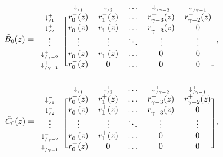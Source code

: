 \documentclass{article}
\begin{document}
\begin{equation*}
\tilde{B}_0(z) = 
\begin{blockarray}{cccccc}
   & \scriptstyle{\downarrow_{/1}^-} & \scriptstyle{\downarrow_{/2}^-} &
   \ldots & \scriptstyle{\downarrow_{/\gamma-2}^-} &
   \scriptstyle{\downarrow_{/\gamma-1}^-} \\
\begin{block}{c[ccccc]}
\scriptstyle{\downarrow_{/1}^+} & r_0^-(z) & r_1^-(z) & \ldots &
    r_{\gamma-3}^-(z) & r_{\gamma-2}^-(z) \\
\scriptstyle{\downarrow_{/2}^+} & r_0^-(z) & r_1^-(z) & \ldots &
    r_{\gamma-3}^-(z) & 0 \\
\vdots & \vdots & \vdots & \ddots & \vdots & \vdots \\
\scriptstyle{\downarrow_{/\gamma-2}^+} & r_0^-(z) & r_1^-(z) &
    \ldots & 0 & 0 \\
\scriptstyle{\downarrow_{/\gamma-1}^+} & r_0^-(z) & 0 & \ldots & 0 & 0 \\
\end{block}
\end{blockarray},
\end{equation*}
\begin{equation*}
\tilde{C}_0(z) = 
\begin{blockarray}{cccccc}
   & \scriptstyle{\downarrow_{/1}^+} & \scriptstyle{\downarrow_{/2}^+} &
    \ldots & \scriptstyle{\downarrow_{/\gamma-2}^+} &
    \scriptstyle{\downarrow_{/\gamma-1}^+} \\
\begin{block}{c[ccccc]}
\scriptstyle{\downarrow_{/1}^-} & r_0^+(z) & r_1^+(z) & \ldots &
    r_{\gamma-3}^+(z) & r_{\gamma-2}^+(z) \\
\scriptstyle{\downarrow_{/2}^-} & r_0^+(z) & r_1^+(z) & \ldots &
    r_{\gamma-3}^+(z) & 0 \\
\vdots & \vdots & \vdots & \ddots & \vdots & \vdots \\
\scriptstyle{\downarrow_{/\gamma-2}^-} & r_0^+(z) & r_1^+(z) & \ldots &
    0 & 0 \\
\scriptstyle{\downarrow_{/\gamma-1}^-} & r_0^+(z) & 0 & \ldots & 0 & 0 \\
\end{block}
\end{blockarray},
\end{equation*}
\end{document}
